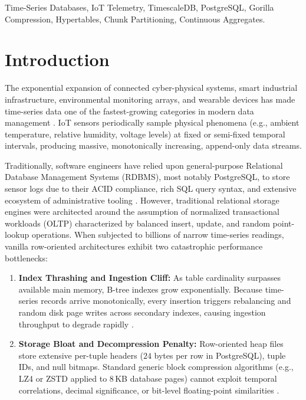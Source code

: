 \documentclass[conference,a4paper]{IEEEtran}
\begin{document}
\begin{IEEEkeywords}
Time-Series Databases, IoT Telemetry, TimescaleDB, PostgreSQL, Gorilla Compression, Hypertables, Chunk Partitioning, Continuous Aggregates.
\end{IEEEkeywords}

\section{Introduction}
The exponential expansion of connected cyber-physical systems, smart industrial infrastructure, environmental monitoring arrays, and wearable devices has made time-series data one of the fastest-growing categories in modern data management \cite{pelkonen2015gorilla, bader2021survey}. IoT sensors periodically sample physical phenomena (e.g., ambient temperature, relative humidity, voltage levels) at fixed or semi-fixed temporal intervals, producing massive, monotonically increasing, append-only data streams. 

Traditionally, software engineers have relied upon general-purpose Relational Database Management Systems (RDBMS), most notably PostgreSQL, to store sensor logs due to their ACID compliance, rich SQL query syntax, and extensive ecosystem of administrative tooling \cite{freedman2017timescaledb}. However, traditional relational storage engines were architected around the assumption of normalized transactional workloads (OLTP) characterized by balanced insert, update, and random point-lookup operations. When subjected to billions of narrow time-series readings, vanilla row-oriented architectures exhibit two catastrophic performance bottlenecks:
\begin{enumerate}
    \item \textbf{Index Thrashing and Ingestion Cliff:} As table cardinality surpasses available main memory, B-tree indexes grow exponentially. Because time-series records arrive monotonically, every insertion triggers rebalancing and random disk page writes across secondary indexes, causing ingestion throughput to degrade rapidly \cite{freedman2017timescaledb, li2021tsbenchmark}.
    \item \textbf{Storage Bloat and Decompression Penalty:} Row-oriented heap files store extensive per-tuple headers ($24$ bytes per row in PostgreSQL), tuple IDs, and null bitmaps. Standard generic block compression algorithms (e.g., LZ4 or ZSTD applied to 8\,KB database pages) cannot exploit temporal correlations, decimal significance, or bit-level floating-point similarities \cite{zhang2022elf, qiao2022chimp}.
\end{enumerate}
\end{document}
